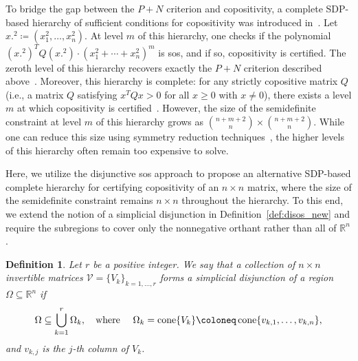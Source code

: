 \documentclass[12pt]{article}
\newcommand{\reals}{\mathbb{R}}
\newcommand{\defeq}{\coloneq}
\newcommand{\cone}{\operatornamewithlimits{cone}}
\newcommand{\mcV}{\mathcal{V}}
\newtheorem{definition}{Definition}%
\theoremstyle{remark}
\begin{document}

To bridge the gap between the $P+N$ criterion and copositivity, a complete SDP-based hierarchy of sufficient conditions
for copositivity was introduced in~\cite{Parrilo2000}.
Let $x.^2\defeq(x_1^2,\ldots,x_n^2)$. At level $m$ of this hierarchy, one checks if the polynomial $(x.^2)^TQ(x.^2)\cdot(x_1^2 + \cdots + x_n^2)^m$ is sos, and if so, copositivity is certified. The zeroth level of this hierarchy recovers exactly the $P+N$ criterion described above~\cite{Parrilo2000}.
Moreover, this hierarchy is complete: for any strictly copositive matrix $Q$ (i.e., a matrix $Q$ satisfying $x^TQx> 0$ for all $x\ge 0$ with $x\neq 0$), there exists a level $m$ at which copositivity is certified~\cite{Parrilo2000, reznick1995uniform}.
However, the size of the semidefinite constraint at level $m$ of this hierarchy grows as $\binom{n+m+2}{n} \times \binom{n+m+2}{n}$. While one can reduce this size using symmetry reduction techniques~\cite[Section 8.1]{Gatermann2004}, the higher levels of this hierarchy often remain too expensive to solve. 

Here, we utilize the disjunctive sos approach to propose an alternative SDP-based complete hierarchy for certifying copositivity of an $n\times n$ matrix, where the size of the semidefinite constraint remains $n\times n$ throughout the hierarchy. To this end, we extend the notion of a simplicial disjunction in Definition~\ref{def:disos_new} and require the subregions to cover only the nonnegative orthant rather than all of $\reals^n$.

\begin{definition}\label{def:sd_simplex}
Let $r$ be a positive integer. We say that a collection of $n\times n$ invertible matrices $\mcV=\{V_k\}_{k=1,\ldots,r}$ forms a \emph{simplicial disjunction} of a region $\Omega\subseteq\reals^n$ if 
\[\Omega\subseteq \bigcup\limits_{k=1}^r\Omega_k,\quad \text{where }\quad\Omega_k=\cone\{V_k\}\defeq\cone\{v_{k,1}, \ldots, v_{k,n}\},\]
and $v_{k,j}$ is the $j$-th column of $V_k$.
\end{definition}
\end{document}
